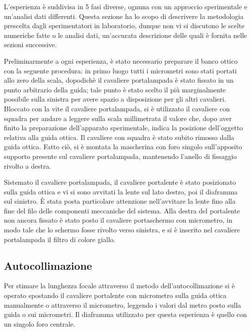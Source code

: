 L'esperienza \`e suddivisa in 5 fasi diverse, ognuna con 
un approccio sperimentale e un'analisi dati differenti. Questa 
sezione ha lo scopo di descrivere la metodologia prescelta dagli 
sperimentatori in laboratorio, dunque non vi si discutono le scelte 
numeriche fatte o le analisi dati, un'accurata descrizione delle 
quali è fornita nelle sezioni successive.

Preliminarmente a ogni esperienza, è stato necessario preparare il 
banco ottico con la seguente procedura: in primo luogo tutti i 
micrometri sono stati portati allo zero della scala, dopodichè il 
cavaliere portalampada \`e stato fissato in un punto arbitrario della 
guida; tale punto è stato scelto il più marginalmente possibile 
sulla sinistra per avere spazio a disposizione per gli altri 
cavalieri. Bloccato con la vite il cavaliere portalampada, si 
\`e utilizzato il cavaliere con squadra per andare a leggere sulla scala 
millimetrata il valore che, dopo aver finito la preparazione 
dell'apparato sperimentale, indica la posizione 
dell'oggetto relativa alla guida ottica. Il cavaliere con squadra \`e stato subito
 rimosso dalla guida ottica. Fatto ciò, si \`e montata la 
mascherina con foro singolo sull'apposito supporto presente sul 
cavaliere portalampada, mantenendo l'anello di fissaggio rivolto a 
destra.

Sistemato il cavaliere portalampada, il cavaliere 
portalente \`e stato posizionato sulla guida ottica e vi si sono avvitati la 
lente sul lato destro, poi il diaframma sul sinistro. \`E stata posta 
particolare attenzione nell'avvitare la lente fino alla fine del 
filo delle componenti meccaniche del sistema. Alla destra del 
portalente non ancora fissato \`e stato posto il cavaliere portaschermo con 
micrometro, in modo tale che lo schermo fosse rivolto verso sinistra, 
e si \`e inserito nel cavaliere portalampada il filtro di colore giallo.

\subsection{Autocollimazione}
Per stimare la lunghezza focale attraverso il metodo 
dell'autocollimazione si è operato spostando il cavaliere portalente 
con micrometro sulla guida ottica manualmente o attraverso il 
micrometro, leggendo i valori dal metro posto sulla guida 
o sui micrometri. Il diaframma utilizzato per questa esperienza è 
quello con un singolo foro centrale. 

